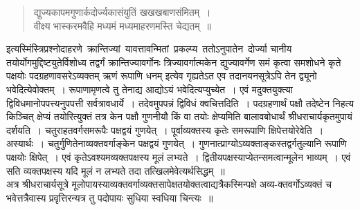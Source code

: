 \documentclass[11pt, openany]{book}
\begin{document}
\begin{quote}
    \qt
 द्युज्यकापमगुणार्कदोर्ज्यकासंयुतिं खखखबाणसंमितम्~। \\
 वीक्ष्य भास्करमवैहि मध्यमं मध्यमाहरणमस्ति चेद्यतम्~॥ 
\end{quote}

इत्यस्मिंस्त्रिप्रश्नोदाहरणे \,क्रान्तिज्यां \,यावत्तावन्मितां \,प्रकल्प्य \,ततोऽनुपातेन \,दोर्ज्या चानीय तयोर्योगमुद्दिष्टयुतेर्विशोध्य तद्वर्गं क्रान्तिज्यावर्गोनः 
त्रिज्यावर्गात्मकेन द्युज्यावर्गेण समं कृत्वा समशोधने कृते पक्षयोः 
पदग्रहणावसरेऽव्यक्तम् ऋणं रूपाणि धनम् इत्येव गृह्यतेऽत एव तदानयनसूत्रेऽपि 
तेन द्व्यूनो भवेदित्येवोक्तम्~। रूपाणामृणत्वे तु तेनाद्य आद्योऽयं
भवेदित्यप्युच्येत~। एवं मदुक्तयुक्त्या द्विविधमानोपपत्त्यनुपपत्ती सर्वत्रावधार्ये~।
तदेवमुपपन्नं द्विविधं क्वचित्तदिति~। पदग्रहणार्थं पक्षौ तदेष्टेन निहत्य किञ्चित् क्षेप्यं
तयोरित्युक्तं तत्र केन पक्षौ गुणनीयौ किं वा तयोः क्षेप्यमिति बालावबोधार्थं
श्रीधराचार्यकृतमुपायं दर्शयति~। चतुराहतवर्गसमरूपैः पक्षद्वयं गुणयेत्~।
पूर्वाव्यक्तस्य कृतेः समरूपाणि क्षिपेत्तयोरेवेति~। अस्यार्थः~। चतुर्गुणितेनाव्यक्तवर्गाङ्केन
पक्षद्वयं गुणयेत्~। गुणनात्प्राग्योऽव्यक्ताङ्कस्तद्वर्गतुल्यानि रूपाणि पक्षयोः क्षिपेत्~। 
एवं कृतेऽवश्यमव्यक्तपक्षस्य मूलं लभ्यते~। द्वितीयपक्षस्याप्येतन्समत्वान्मूलेन 
भाव्यम्~। एवं सति व्यक्तपक्षस्य यदि मूलं न लभ्यते तदा तत्खिलमेवेत्यर्थसिद्धम्~॥ \\

\vspace{-3mm}
 अत्र श्रीधराचार्यसूत्रे मूलोपायस्याव्यक्तवर्गाव्यक्तसापेक्षतयोक्तत्वाद्यत्रैकस्मिन्पक्षे अव्य-क्तवर्गोऽव्यक्तं च भवेत्तत्रैवास्य प्रवृत्तिरन्यत्र तु पदोपायः सुधिया स्वधिया चिन्त्यः~॥ \\
\end{document}
